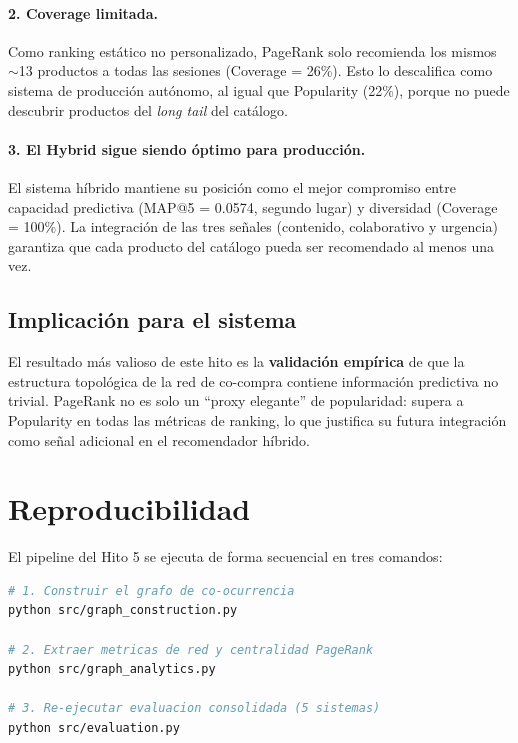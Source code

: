 \documentclass[12pt,a4paper]{article}
\begin{document}
\paragraph{2. Coverage limitada.} Como ranking estático no personalizado, PageRank solo recomienda los mismos $\sim$13 productos a todas las sesiones (Coverage = 26\%). Esto lo descalifica como sistema de producción autónomo, al igual que Popularity (22\%), porque no puede descubrir productos del \textit{long tail} del catálogo.

\paragraph{3. El Hybrid sigue siendo óptimo para producción.} El sistema híbrido mantiene su posición como el mejor compromiso entre capacidad predictiva (MAP@5 = 0.0574, segundo lugar) y diversidad (Coverage = 100\%). La integración de las tres señales (contenido, colaborativo y urgencia) garantiza que cada producto del catálogo pueda ser recomendado al menos una vez.

\subsection{Implicación para el sistema}

El resultado más valioso de este hito es la \textbf{validación empírica} de que la estructura topológica de la red de co-compra contiene información predictiva no trivial. PageRank no es solo un ``proxy elegante'' de popularidad: supera a Popularity en todas las métricas de ranking, lo que justifica su futura integración como señal adicional en el recomendador híbrido.

\section{Reproducibilidad}

El pipeline del Hito 5 se ejecuta de forma secuencial en tres comandos:

\begin{lstlisting}[style=pystyle, language=bash]
# 1. Construir el grafo de co-ocurrencia
python src/graph_construction.py

# 2. Extraer metricas de red y centralidad PageRank
python src/graph_analytics.py

# 3. Re-ejecutar evaluacion consolidada (5 sistemas)
python src/evaluation.py
\end{lstlisting}
\end{document}
